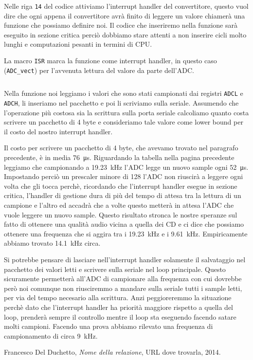 \documentclass[a4paper,11pt]{article}
\newcommand\source[2]{
	\inputminted[fontsize=\footnotesize,linenos=true,tabsize=4]{#1}{#2}
}
\begin{document}
Nelle riga \texttt{14} del codice attiviamo l'interrupt handler del convertitore, questo vuol dire che ogni appena il convertitore avrà finito di leggere un valore chiamerà una funzione che possiamo definire noi. Il codice che inseriremo nella funzione sarà eseguito in sezione critica perciò dobbiamo stare attenti a non inserire cicli molto lunghi e computazioni pesanti in termini di CPU.

La macro \texttt{ISR} marca la funzione come interrupt handler, in questo caso (\texttt{ADC\_vect}) per l'avvenuta lettura del valore da parte dell'ADC.

\source{cpp}{adc_interrupt_rel}

Nella funzione noi leggiamo i valori che sono stati campionati dai registri \texttt{ADCL} e \texttt{ADCH}, li inseriamo nel pacchetto e poi li scriviamo sulla seriale. Assumendo che l'operazione più costosa sia la scrittura sulla porta seriale calcoliamo quanto costa scrivere un pacchetto di 4 byte e consideriamo tale valore come lower bound per il costo del nostro interrupt handler.

Il costo per scrivere un pacchetto di 4 byte, che avevamo trovato nel paragrafo precedente, è in media \SI{76}{\micro\second}. Riguardando la tabella nella pagina precedente leggiamo che campionando a \SI{19.23}{\kilo\hertz} l'ADC legge un nuovo sample ogni \SI{52}{\micro\second}. Impostando perciò un prescaler minore di 128 l'ADC non riuscirà a leggere ogni volta che gli tocca perchè, ricordando che l'interrupt handler esegue in sezione critica, l'handler di gestione dura di più del tempo di attesa tra la lettura di un campione e l'altro ed accadrà che a volte questo metterà in attesa l'ADC che vuole leggere un nuovo sample.
Questo risultato stronca le nostre speranze sul fatto di ottenere una qualità audio vicina a quella dei CD e ci dice che possiamo ottenere una frequenza che si aggira tra i \SI{19.23}{\kilo\hertz} e i \SI{9.61}{\kilo\hertz}. Empiricamente abbiamo trovato \SI{14.1}{\kilo\hertz} circa.

\vspace{0.2in}
Si potrebbe pensare di lasciare nell'interrupt handler solamente il salvataggio nel pacchetto dei valori letti e scrivere sulla seriale nel loop principale. Questo sicuramente permetterà all'ADC di campionare alla frequenza con cui dovrebbe però noi comunque non riusciremmo a mandare sulla seriale tutti i sample letti, per via del tempo necesario alla scrittura. Anzi peggioreremmo la situazione perchè dato che l'interrupt handler ha priorità maggiore rispetto a quella del loop, prenderà sempre il controllo mentre il loop sta eseguendo facendo satare molti campioni. Facendo una prova abbiamo rilevato una frequenza di campionamento di circa \SI{9}{\kilo\hertz}.

\begin{thebibliography}{9}

  Francesco Del Duchetto,
  \emph{Nome della relazione},
  URL dove trovarla,
  2014.

\end{thebibliography}
\end{document}
